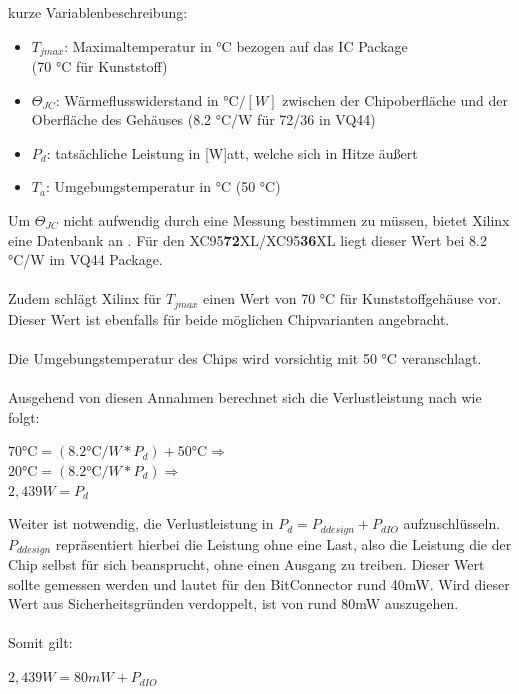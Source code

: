 \documentclass{article}
\begin{document}
\newpage

kurze Variablenbeschreibung:

\begin{itemize}
	\item $T_{jmax}$: Maximaltemperatur in \si{\celsius} bezogen auf das IC Package \\(70 \si{\celsius} für Kunststoff) \autocite[54]{Device_pkg}
	\item $\Theta_{JC}$: Wärmeflusswiderstand in $\si{\celsius}/[W]$ zwischen der Chipoberfläche und der Oberfläche des Gehäuses \autocite[53]{Device_pkg} (8.2 \si{\celsius}/W für 72/36 in VQ44)
	\item $P_d$: tatsächliche Leistung in [W]att, welche sich in Hitze äußert \autocite[16]{XC95_maxI}
	\item $T_a$: Umgebungstemperatur in \si{\celsius} (50 \si{\celsius})
\end{itemize}

Um $\Theta_{JC}$ nicht aufwendig durch eine Messung bestimmen zu müssen, bietet Xilinx eine Datenbank an \autocite{ThetaJC}. Für den XC95\textbf{72}XL/XC95\textbf{36}XL liegt dieser Wert bei 8.2 \si{\celsius}/W im VQ44 Package.\\\\
Zudem schlägt Xilinx für $T_{jmax}$ einen Wert von 70 \si{\celsius} für Kunststoffgehäuse vor. Dieser Wert ist ebenfalls für beide möglichen Chipvarianten angebracht.\\\\
Die Umgebungstemperatur des Chips wird vorsichtig mit 50 \si{\celsius} veranschlagt.\\\\
Ausgehend von diesen Annahmen berechnet sich die Verlustleistung nach \autocite[16]{XC95_maxI} wie folgt:

\begin{center}
	$70 \si{\celsius} = (8.2 \si{\celsius}/W*P_d)+50 \si{\celsius} \Rightarrow$\\
	$20 \si{\celsius} = (8.2 \si{\celsius}/W*P_d)\Rightarrow$\\
	$2,439 W = P_d$\\ \vspace{0.5cm}
\end{center}
	Weiter ist notwendig, die Verlustleistung in $P_d = P_{ddesign} + P_{dIO}$ aufzuschlüsseln.
$P_{ddesign}$ repräsentiert hierbei die Leistung ohne eine Last, also die Leistung die der Chip selbst für sich beansprucht, ohne einen Ausgang zu treiben. Dieser Wert sollte gemessen werden und lautet für den BitConnector rund 40mW. Wird dieser Wert aus Sicherheitsgründen verdoppelt, ist von rund 80mW auszugehen.\\\\
Somit gilt: 
\begin{center}
	$2,439 W = 80mW + P_{dIO}$
\end{center}
\end{document}

